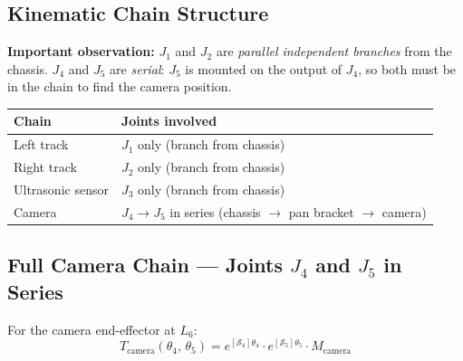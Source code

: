 \documentclass[12pt,a4paper]{article}
\begin{document}
\subsection{Kinematic Chain Structure}

\textbf{Important observation:} $J_1$ and $J_2$ are \emph{parallel independent
branches} from the chassis. $J_4$ and $J_5$ are \emph{serial}: $J_5$ is mounted
on the output of $J_4$, so both must be in the chain to find the camera position.

\begin{center}
\renewcommand{\arraystretch}{1.2}
\begin{tabular}{L{3cm} L{11cm}}
\toprule
\textbf{Chain} & \textbf{Joints involved} \\
\midrule
Left track      & $J_1$ only (branch from chassis) \\
Right track     & $J_2$ only (branch from chassis) \\
Ultrasonic sensor & $J_3$ only (branch from chassis) \\
Camera          & $J_4 \to J_5$ in series (chassis $\to$ pan bracket $\to$ camera) \\
\bottomrule
\end{tabular}
\end{center}

\subsection{Full Camera Chain --- Joints $J_4$ and $J_5$ in Series}

For the camera end-effector at $L_6$:
\[
  T_{\text{camera}}(\theta_4,\,\theta_5)
  = e^{[\mathcal{S}_4]\theta_4}
    \cdot e^{[\mathcal{S}_5]\theta_5}
    \cdot M_{\text{camera}}
\]
\end{document}
